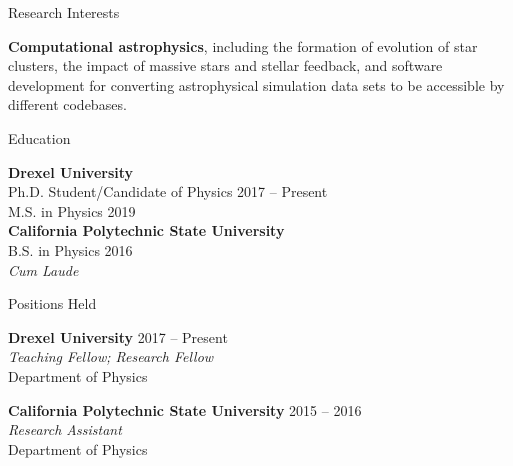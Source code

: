 \documentclass{resume} %
\begin{document}


\begin{rSection}{Research Interests}

\textbf{Computational astrophysics}, including the formation of evolution of star clusters, the impact of massive stars and stellar feedback, and software development for converting astrophysical simulation data sets to be accessible by different codebases.

\end{rSection}


\begin{rSection}{Education}

\textbf{Drexel University} \\%
{\color{MidnightBlue} Ph.D.} Student/Candidate of Physics \hfill {2017 -- Present} \\
{\color{MidnightBlue} M.S.} in Physics \hfill{2019}\\
\textbf{California Polytechnic State University} \\%
{\color{MidnightBlue} B.S.} in Physics \hfill{2016}\\
\textit{Cum Laude}

\end{rSection}


\begin{rSection}{Positions Held}

\textbf{Drexel University} \hfill {2017 -- Present} \\
\textit{Teaching Fellow; Research Fellow}\\
Department of Physics

\textbf{California Polytechnic State University} \hfill {2015 -- 2016}\\
\textit{Research Assistant}\\
Department of Physics

\end{rSection}
\end{document}
